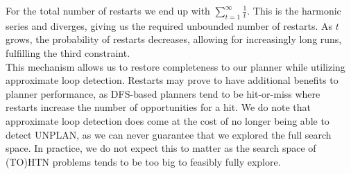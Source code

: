 For the total number of restarts we end up with $\sum_{t = 1}^\infty \frac{1}{t}$. This is the harmonic series and diverges, giving us the required unbounded number of restarts. As $t$ grows, the probability of restarts decreases, allowing for increasingly long runs, fulfilling the third constraint. \\
This mechanism allows us to restore completeness to our planner while utilizing approximate loop detection. Restarts may prove to have additional benefits to planner performance, as DFS-based planners tend to be hit-or-miss where restarts increase the number of opportunities for a hit. We do note that approximate loop detection does come at the cost of no longer being able to detect UNPLAN, as we can never guarantee that we explored the full search space. In practice, we do not expect this to matter as the search space of (TO)HTN problems tends to be too big to feasibly fully explore.
\begin{comment}
- false positives mean we loose completeness
- i.e. if we perform progression search and $p = p_0, \ldots, p_n$ defines a path of search nodes from initial node to goal
- then for any $p_i$ in $p$, search nodes $p_0, \ldots, p_{i-1}$ may collectively set the $k$ hashes produced by $p_i$, filtering it out
- the chance of all paths to a goal node being filtered out as false positives only increases with each path we wrongly explore
- overall, we loose completeness

- one way to get completeness back: restarts while changing the seeds of the hash function
- assuming perfect hashing, for different seeds our hashes are completely uncorrelated
- as the number of restarts increases, the chance of encountering a false positive on the path start - goal every single time goes to zero
- only an infinite number of restarts as runtime goes to infinity does guarantee us this property
- we need arbitrarily long runs in between restarts, as plans may be arbitrarily long
- to be precise, we could limit plan length by the combination of maximum depth before a plan must exist (if it does at all) and maximum expansion factor (i.e. max. number of children of any task)
- simply allowing runs of any length simplifies the implementation, though
- we choose to check for a restart each second and, at second $t$, do it with probability $1 / t$
- for expected number of restarts we get $\sum_{t=1}^{\infty} \frac{1}{t}$
- this is a geometric series which diverges
- average time between restarts increases as time progresses
- both properties are what we want!
\end{comment}

